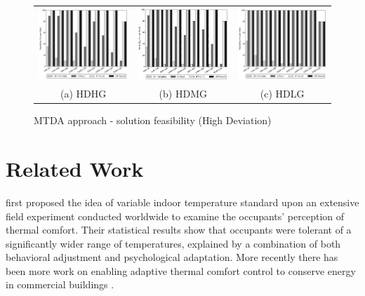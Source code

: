 \begin{figure}
\begin{tabular}{ccc}
\includegraphics[width=.30\linewidth,keepaspectratio]{figs/feasibility_cvs_oarb_high_highr_mtd.png} &
\includegraphics[width=.30\linewidth,keepaspectratio]{figs/feasibility_cvs_oarb_high_mediumr_mtd.png} &
\includegraphics[width=.30\linewidth,keepaspectratio]{figs/feasibility_cvs_oarb_high_lowr_mtd.png} \\
(a) HDHG & (b) HDMG & (c) HDLG
\end{tabular}
\caption{MTDA approach - solution feasibility (High Deviation)}
\label{fig:mtd_mfhr}
\end{figure}







\section{Related Work}\label{sec:atc_related}

\cite{de1998developing} first proposed the idea of variable indoor temperature standard upon an extensive field experiment conducted worldwide to examine the occupants' perception of thermal comfort. Their statistical results show that occupants were tolerant of a significantly wider range of temperatures, explained by a combination of both behavioral adjustment and psychological adaptation. More recently there has been more work on enabling adaptive thermal comfort control to conserve energy in commercial buildings \citep{egan2010the,chew2015adaptive,klein2012coordinating,ward2010automate,yang2013development}.

